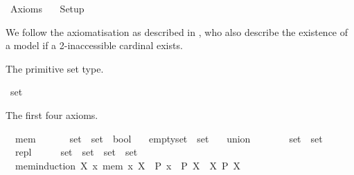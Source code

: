 %
\begin{isabellebody}%
%
%
\isadelimdocument
%
\endisadelimdocument
%
\isatagdocument
\isanewline
%
\isamarkuptrue%
%
\endisatagdocument
{\isafolddocument}%
%
\isadelimdocument
%
\endisadelimdocument
%
\isadelimtheory
%
\endisadelimtheory
%
\isatagtheory
{}\isamarkupfalse%
\ Axioms\isanewline
\ \ \ Setup\isanewline
{}%
\endisatagtheory
{\isafoldtheory}%
%
\isadelimtheory
%
\endisadelimtheory
%
\isadelimdocument
%
\endisadelimdocument
%
\isatagdocument
%
\isamarkuptrue%
%
\endisatagdocument
{\isafolddocument}%
%
\isadelimdocument
%
\endisadelimdocument
%
\begin{isamarkuptext}%
We follow the axiomatisation as described in \cite{brown_et_al:LIPIcs:2019:11064},
who also describe the existence of a model if a 2-inaccessible cardinal exists.%
\end{isamarkuptext}\isamarkuptrue%
%
\begin{isamarkuptext}%
The primitive set type.%
\end{isamarkuptext}\isamarkuptrue%
\isamarkupfalse%
\ set%
\begin{isamarkuptext}%
The first four axioms.%
\end{isamarkuptext}\isamarkuptrue%
\isamarkupfalse%
\isanewline
\ \ mem\ \ \ \ \ \ {\isacharcolon}{\kern0pt}{\isacharcolon}{\kern0pt}\ {\isacartoucheopen}set\ {\isasymRightarrow}\ set\ {\isasymRightarrow}\ bool{\isacartoucheclose}\ \isanewline
\ \ emptyset\ {\isacharcolon}{\kern0pt}{\isacharcolon}{\kern0pt}\ {\isacartoucheopen}set{\isacartoucheclose}\ \isanewline
\ \ union\ \ \ \ \ \ \ {\isacharcolon}{\kern0pt}{\isacharcolon}{\kern0pt}\ {\isacartoucheopen}set\ {\isasymRightarrow}\ set{\isacartoucheclose}\ \isanewline
\ \ repl\ \ \ \ \ {\isacharcolon}{\kern0pt}{\isacharcolon}{\kern0pt}\ {\isacartoucheopen}set\ {\isasymRightarrow}\ {\isacharparenleft}{\kern0pt}set\ {\isasymRightarrow}\ set{\isacharparenright}{\kern0pt}\ {\isasymRightarrow}\ set{\isacartoucheclose}\isanewline
{}\isanewline
\ \ mem{\isacharunderscore}{\kern0pt}induction{\isacharcolon}{\kern0pt}\ {\isachardoublequoteopen}{\isacharparenleft}{\kern0pt}{\isasymforall}X{\isachardot}{\kern0pt}\ {\isacharparenleft}{\kern0pt}{\isasymforall}x{\isachardot}{\kern0pt}\ mem\ x\ X\ {\isasymlongrightarrow}\ P\ x{\isacharparenright}{\kern0pt}\ {\isasymlongrightarrow}\ P\ X{\isacharparenright}{\kern0pt}\ {\isasymlongrightarrow}\ {\isacharparenleft}{\kern0pt}{\isasymforall}X{\isachardot}{\kern0pt}\ P\ X{\isacharparenright}{\kern0pt}{\isachardoublequoteclose}\ \isanewline

\end{isabellebody}
